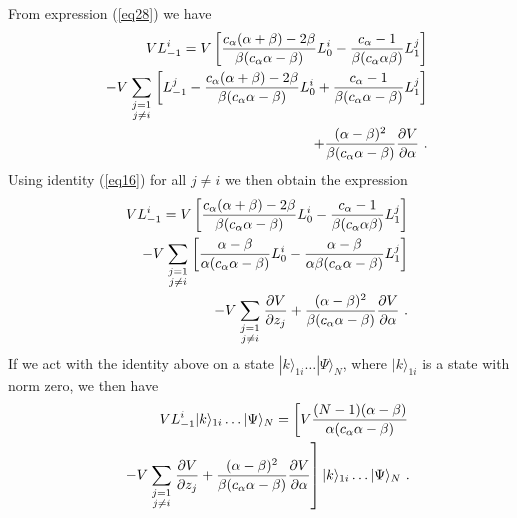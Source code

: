 \documentclass[a4paper,12pt]{article}
\begin{document}
From expression (\ref{eq28}) we have
\begin{eqnarray}
 & & VL_{-1}^i=V\left[ \frac{c_\alpha (\alpha +\beta )-2\beta }{\beta (c_\alpha \alpha -\beta )}L_0^i-\frac{c_\alpha -1}{\beta (c_\alpha \alpha \beta )}L_1^j\right] \nonumber \\ 
 & & -V\sum_{\scriptstyle j=1\atop \scriptstyle j\neq i}\left[ L_{-1}^j-\frac{c_\alpha (\alpha +\beta )-2\beta }{\beta (c_\alpha \alpha -\beta )}L_0^i+\frac{c_\alpha -1}{\beta (c_\alpha \alpha -\beta )}L_1^j\right] \nonumber \\ 
 & & +\frac{(\alpha -\beta )^2}{\beta (c_\alpha \alpha -\beta )}\frac{\partial V}{\partial \alpha }\ .
\end{eqnarray}
Using identity (\ref{eq16}) for all $j\neq i$ we then obtain the expression
\begin{eqnarray}
 & & VL_{-1}^i=V\left[ \frac{c_\alpha (\alpha +\beta )-2\beta }{\beta (c_\alpha \alpha -\beta )}L_0^i-\frac{c_\alpha -1}{\beta (c_\alpha \alpha \beta )}L_1^j\right] \nonumber \\ 
 & & -V\sum_{\scriptstyle j=1\atop \scriptstyle j\neq i}\left[ \frac{\alpha -\beta }{\alpha (c_\alpha \alpha -\beta )}L_0^i-\frac{\alpha -\beta }{\alpha \beta (c_\alpha \alpha -\beta )}L_1^j\right] \nonumber \\ 
 & & -V\sum_{\scriptstyle j=1\atop \scriptstyle j\neq i}\frac{\partial V}{\partial z_j} +\frac{(\alpha -\beta )^2}{\beta (c_\alpha \alpha -\beta )}\frac{\partial V}{\partial \alpha }\ .
\end{eqnarray}
If we act with the identity above on a state $|k\rangle _{1i}\dots |\Psi \rangle _N$, where $|k\rangle _{1i}$ is a state with norm zero, we then have
\begin{eqnarray}
 & & VL_{-1}^i|k\rangle _{1i}\dots |\Psi \rangle _N=\left[ V\frac{(N-1)(\alpha -\beta )}{\alpha (c_\alpha \alpha -\beta )}\right. \nonumber \\ 
\label{eq32}
 & & \left. -V\sum_{\scriptstyle j=1\atop \scriptstyle j\neq i}\frac{\partial V}{\partial z_j} +\frac{(\alpha -\beta )^2}{\beta (c_\alpha \alpha -\beta )}\frac{\partial V}{\partial \alpha }\right] |k\rangle _{1i}\dots |\Psi \rangle _N\ .
\end{eqnarray}
\end{document}
